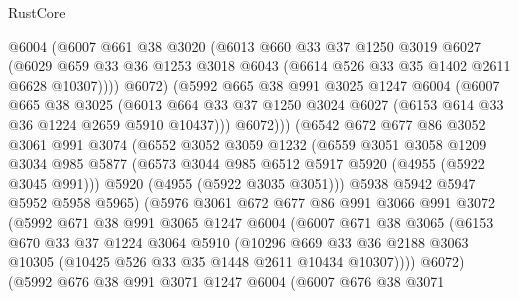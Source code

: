\begin{lexlean}{RustCore}
\begin{coremodule}
              @6004
              (@6007
                @661
                @38
                @3020
                (@6013
                  @660
                  @33
                  @37
                  @1250
                  @3019
                  @6027
                  (@6029
                    @659
                    @33
                    @36
                    @1253
                    @3018
                    @6043
                    (@6614 @526 @33 @35 @1402 @2611 @6628 @10307))))
              @6072)
            (@5992
              @665
              @38
              @991
              @3025
              @1247
              @6004
              (@6007
                @665
                @38
                @3025
                (@6013
                  @664
                  @33
                  @37
                  @1250
                  @3024
                  @6027
                  (@6153 @614 @33 @36 @1224 @2659 @5910 @10437)))
              @6072)))
        (@6542
          @672
          @677
          @86
          @3052
          @3061
          @991
          @3074
          (@6552
            @3052
            @3059
            @1232
            (@6559
              @3051
              @3058
              @1209
              @3034
              @985
              @5877
              (@6573 @3044 @985 @6512 @5917 @5920 (@4955 (@5922 @3045 @991)))
              @5920
              (@4955 (@5922 @3035 @3051)))
            @5938
            @5942
            @5947
            @5952
            @5958
            @5965)
          (@5976
            @3061
            @672
            @677
            @86
            @991
            @3066
            @991
            @3072
            (@5992
              @671
              @38
              @991
              @3065
              @1247
              @6004
              (@6007
                @671
                @38
                @3065
                (@6153
                  @670
                  @33
                  @37
                  @1224
                  @3064
                  @5910
                  (@10296
                    @669
                    @33
                    @36
                    @2188
                    @3063
                    @10305
                    (@10425 @526 @33 @35 @1448 @2611 @10434 @10307))))
              @6072)
            (@5992
              @676
              @38
              @991
              @3071
              @1247
              @6004
              (@6007
                @676
                @38
                @3071

\end{coremodule}
\end{lexlean}
